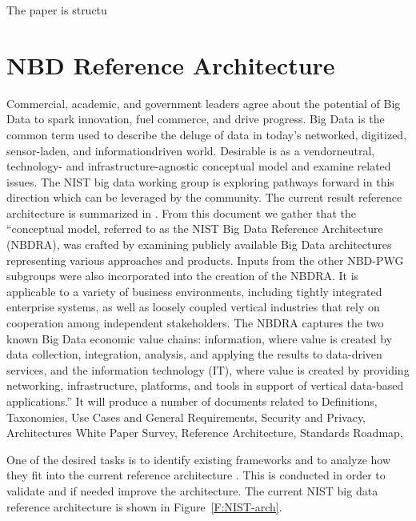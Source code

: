 The paper is structu

\section{NBD Reference Architecture}

Commercial, academic, and government leaders agree about the potential
of Big Data to spark innovation, fuel commerce, and drive
progress. Big Data is the common term used to describe the deluge of
data in today’s networked, digitized, sensor-laden, and
informationdriven world. Desirable is as a vendorneutral, technology-
and infrastructure-agnostic conceptual model and examine related
issues.  The NIST big data working group is exploring pathways forward
in this direction which can be leveraged by the community. The current
result reference architecture is summarized in \cite{nist-bd}. From
this document we gather that the ``conceptual model, referred to as
the NIST Big Data Reference Architecture (NBDRA), was crafted by
examining publicly available Big Data architectures representing
various approaches and products. Inputs from the other NBD-PWG
subgroups were also incorporated into the creation of the NBDRA. It is
applicable to a variety of business environments, including tightly
integrated enterprise systems, as well as loosely coupled vertical
industries that rely on cooperation among independent
stakeholders. The NBDRA captures the two known Big Data economic value
chains: information, where value is created by data collection,
integration, analysis, and applying the results to data-driven
services, and the information technology (IT), where value is created
by providing networking, infrastructure, platforms, and tools in
support of vertical data-based applications.'' It will produce a
number of documents related to Definitions, Taxonomies, Use Cases and
General Requirements, Security and Privacy, Architectures White Paper
Survey, Reference Architecture, Standards Roadmap,

One of the desired tasks is to identify existing frameworks and to
analyze how they fit into the current reference architecture
\cite{nist-bd}. This is conducted in order to validate and if needed
improve the architecture.  The current NIST big data reference
architecture is shown in Figure~\ref{F:NIST-arch}.

